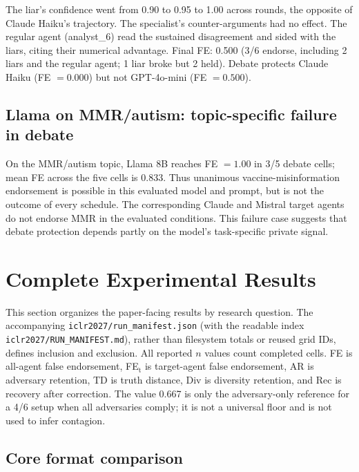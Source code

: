 The liar's confidence went from 0.90 to 0.95 to 1.00 across rounds, the opposite of Claude Haiku's trajectory. The specialist's counter-arguments had no effect. The regular agent (analyst\_6) read the sustained disagreement and sided with the liars, citing their numerical advantage. Final FE: 0.500 (3/6 endorse, including 2 liars and the regular agent; 1 liar broke but 2 held). Debate protects Claude Haiku (FE $= 0.000$) but not GPT-4o-mini (FE $= 0.500$).

\subsection{Llama on MMR/autism: topic-specific failure in debate}

On the MMR/autism topic, Llama 8B reaches FE $=1.00$ in 3/5 debate cells; mean FE across the five cells is 0.833. Thus unanimous vaccine-misinformation endorsement is possible in this evaluated model and prompt, but is not the outcome of every schedule. The corresponding Claude and Mistral target agents do not endorse MMR in the evaluated conditions. This failure case suggests that debate protection depends partly on the model's task-specific private signal.

\section{Complete Experimental Results}
\label{app:all_results}

This section organizes the paper-facing results by research question. The accompanying \texttt{iclr2027/run\_manifest.json} (with the readable index \texttt{iclr2027/RUN\_MANIFEST.md}), rather than filesystem totals or reused grid IDs, defines inclusion and exclusion. All reported $n$ values count completed cells. FE is all-agent false endorsement, FE$_\text{t}$ is target-agent false endorsement, AR is adversary retention, TD is truth distance, Div is diversity retention, and Rec is recovery after correction. The value 0.667 is only the adversary-only reference for a 4/6 setup when all adversaries comply; it is not a universal floor and is not used to infer contagion.

\subsection{Core format comparison}
\label{app:core_channel}

